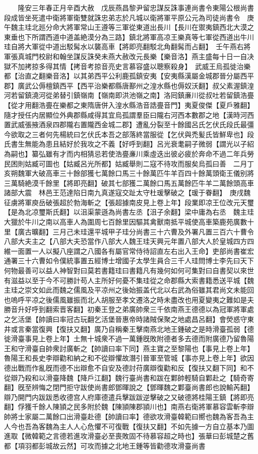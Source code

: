 　　隆安三年春正月辛酉大赦　戊辰燕昌黎尹留忠謀反誅事連尚書令東陽公根尚書段成皆坐死遣中衛將軍衛雙就誅忠弟志於凡城以衛將軍平原公元為司徒尚書令　庚午魏主珪北廵分命大將軍常山王遵等三軍從東道出長川【長川在禦夷鎮西北大漠之東垂也下所謂西道中道盖絶漠分為三路】鎮北將軍高凉王樂真等七軍從西道出牛川珪自將大軍從中道出駁髯水以襲高車【將即亮翻駁北角翻髯而占翻】　壬午燕右將軍張真城門校尉和翰坐謀反誅癸未燕大赦改元長樂【樂音洛】燕主盛每十日一自决獄不加拷掠多得其情【拷音考掠音亮史言慕容盛以聰察殺身】　武威王烏孤徙治樂都【治直之翻樂音洛】以其弟西平公利鹿孤鎮安夷【安夷縣漢屬金城郡晉分屬西平郡】廣武公傉檀鎮西平【西平治樂都縣唐鄯州之湟水縣也傉奴沃翻】叔父素渥鎮湟河若留鎮澆河從弟替引鎮嶺南【嶺南即洪池嶺之南】洛囘鎮亷川從叔吐若留鎮浩亹【從才用翻浩亹在樂都之東隋唐併入湟水縣浩音誥亹音門】夷夏俊傑【夏戶雅翻】隨才授任内居顯位外典郡縣咸得其宜烏孤謂羣臣曰隴右河西本數郡之地【漢時河西置武威張掖酒泉四郡隴右置隴西金城二郡】遭亂分裂至十餘國呂氏乞伏氏段氏最彊今欲取之三者何先楊統曰乞伏氏本吾之部落終當服從【乞伏與禿髪氏皆鮮卑也】段氏書生無能為患且結好於我攻之不義【好呼到翻】呂光衰耄嗣子微弱【謂光以子紹為嗣也】纂弘雖有才而内相猜忌若使浩亹亷川乘虛迭出彼必疲於奔命不過二年兵勞民困則姑臧可圖也【姑臧呂光所都】姑臧舉則二寇不待攻而服矣烏孤曰善　二月丁亥朔魏軍大破高車三十餘部獲七萬餘口馬三十餘萬匹牛羊百四十餘萬頭衛王儀别將三萬騎絶漠千餘里【將即亮翻】破其七部獲二萬餘口馬五萬餘匹牛羊二萬餘頭高車諸部大震　林邑王范達陷日南九真遂寇交趾太守杜瑗擊破之【瑗于眷翻】　庚戌魏征虜將軍庾岳破張超於勃海斬之【張超據南皮見上卷上年】段業即凉王位改元天璽【是為北凉璽斯氏翻】以沮渠蒙遜為尚書左丞【沮子余翻】梁中庸為右丞　魏主珪大獵於牛川之南以高車人為圍周七百餘里因驅其禽獸南抵平城使高車築鹿苑廣數十里【廣古曠翻】三月己未珪還平城甲子珪分尚書三十六曹及外署凡置三百六十曹令八部大夫主之【八部大夫恐當作八部大人魏王珪天興元年置八部大人於皇城四方四維一面置一人以擬八座謂之八國各有屬官常侍待詔直左右出入王命】吏部尚書崔宏通署三十六曹如令僕統事置五經博士增國子太學生員合三千人珪問博士李先曰天下何物最善可以益人神智對曰莫若書籍珪曰書籍凡有幾何如何可集對曰自書契以來世有滋益以至于今不可勝計苟人主所好何憂不集珪從之命郡縣大索書籍悉送平城【魏主珪之崇文如此而魏之儒風及平凉州之後始振盖代北以右武為俗雖其君尚文未能回也嗚呼平凉之後儒風雖振而北人胡服至孝文遷洛之時未盡改也用夏變夷之難如是夫勝音升好呼到翻索晋客翻】初秦王登之弟廣帥衆三千依南燕王德德以為冠軍將軍處之乞活堡【帥讀曰率冠古玩翻乞活堡晉惠帝時諸賊保聚之地處昌呂翻】會熒惑守東井或言秦當復興【復扶又翻】廣乃自稱秦王擊南燕北地王鍾破之是時滑臺孤弱【德徙滑臺事見上卷上年】土無十城衆不過一萬鍾旣敗附德者多去德而附廣德乃留魯陽王和守滑臺自帥衆討廣斬之【帥讀曰率下同】燕主寶之至黎陽也【事見上卷上年】魯陽王和長史李辯勸和納之和不從辯懼故潛引晉軍至管城【事亦見上卷上年】欲因德出戰而作亂旣而德不出辯愈不自安及德討苻廣辯復勸和反【復扶又翻下同】和不從辯乃殺和以滑臺降魏【降戶江翻】魏行臺尚書和跋在鄴帥輕騎自鄴赴之【騎奇寄翻】旣至辨悔之閉門拒守跋使尚書郎鄧暉說之【鄧暉魏之鄴臺尚書郎也說輸芮翻】辯乃開門内跋跋悉收德宫人府庫德遣兵擊跋跋逆擊破之又破德將桂陽王鎮【將即亮翻】俘獲千餘人陳頴之民多附於魏【陳頴陳郡頴川也】南燕右衛將軍慕容雲斬李辯帥將士家屬二萬餘口出滑臺赴德【帥讀曰率】德欲攻滑臺韓範曰嚮也魏為客吾為主人今也吾為客魏為主人人心危懼不可復戰【復扶又翻】不如先據一方自立基本乃圖進取【微韓範之言德若進攻滑臺必至喪敗固不待慕容超之時也】張華曰彭城楚之舊都【項羽都彭城故云然】可攻而據之北地王鍾等皆勸德攻滑臺尚書
